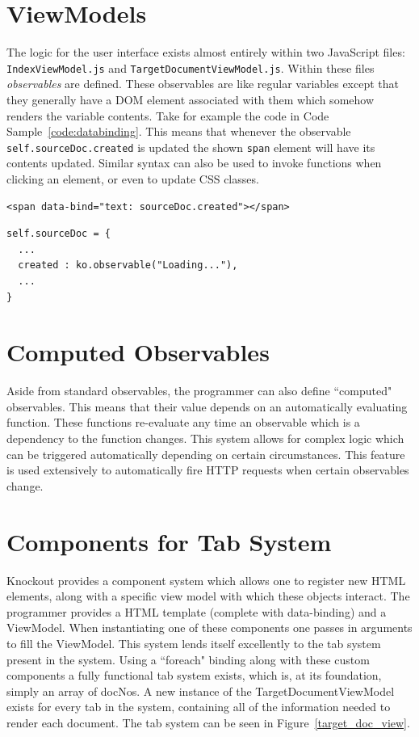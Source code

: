 \documentclass{l4proj}
\newcommand{\code}[1]{\texttt{#1}}
\newenvironment{codelisting}{\captionsetup{type=listing}}{}
\begin{document}
\section{ViewModels}
The logic for the user interface exists almost entirely within two JavaScript files: \code{IndexViewModel.js} and \code{TargetDocumentViewModel.js}. Within these files \textit{observables} are defined. These observables are like regular variables except that they generally have a DOM element associated with them which somehow renders the variable contents.
Take for example the code in Code Sample~\ref{code:databinding}. This means that whenever the observable \code{self.sourceDoc.created} is updated the shown \code{span} element will have its contents updated. Similar syntax can also be used to invoke functions when clicking an element, or even to update CSS classes.
\begin{codelisting}
\begin{verbatim}
<span data-bind="text: sourceDoc.created"></span>
\end{verbatim}
\begin{verbatim}
self.sourceDoc = {
  ...
  created : ko.observable("Loading..."),
  ...
}
\end{verbatim}
\label{code:databinding}
\end{codelisting}

\section{Computed Observables}
Aside from standard observables, the programmer can also define ``computed" observables. This means that their value depends on an automatically evaluating function. These functions re-evaluate any time an observable which is a dependency to the function changes. This system allows for complex logic which can be triggered automatically depending on certain circumstances.
This feature is used extensively to automatically fire HTTP requests when certain observables change.

\section{Components for Tab System}
Knockout provides a component system which allows one to register new HTML elements, along with a specific view model with which these objects interact. The programmer provides a HTML template (complete with data-binding) and a ViewModel. When instantiating one of these components one passes in arguments to fill the ViewModel.
This system lends itself excellently to the tab system present in the system. Using a ``foreach" binding along with these custom components a fully functional tab system exists, which is, at its foundation, simply an array of docNos. A new instance of the TargetDocumentViewModel exists for every tab in the system, containing all of the information needed to render each document. The tab system can be seen in Figure~\ref{target_doc_view}.
\end{document}
